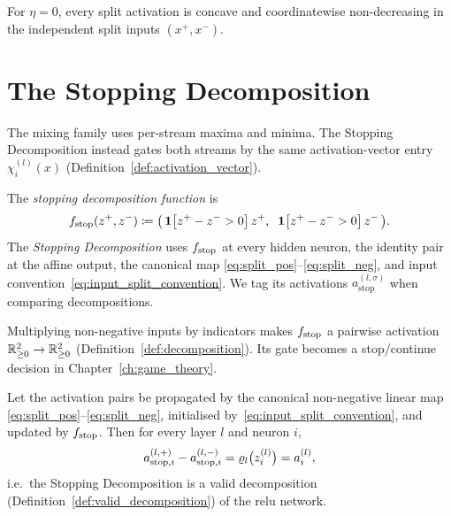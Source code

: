 \begin{remark}[The $\eta=0$ endpoint]\label{rem:eta_zero_extreme}
For $\eta=0$, every split activation is concave and coordinatewise non-decreasing in the independent split inputs $(x^+,x^-)$.
\end{remark}

\section{The Stopping Decomposition}\label{sec:stopping_decomposition}

The mixing family uses per-stream maxima and minima. The Stopping Decomposition instead gates both streams by the same activation-vector entry $\chi_i^{(l)}(x)$ (Definition~\ref{def:activation_vector}).

\begin{definition}\label{def:fstop}
The \emph{stopping decomposition function} is
\begin{equation}
	f_{\mathrm{stop}}(z^+, z^-) \coloneqq \bigl(\, \mathbf{1}\bigl[z^+ - z^- > 0\bigr]\, z^+, \;\; \mathbf{1}\bigl[z^+ - z^- > 0\bigr]\, z^- \,\bigr).
	\label{eq:fstop_def}
\end{equation}
The \emph{Stopping Decomposition} uses $f_{\mathrm{stop}}$ at every hidden neuron, the identity pair at the affine output, the canonical map \eqref{eq:split_pos}--\eqref{eq:split_neg}, and input convention~\eqref{eq:input_split_convention}. We tag its activations $a_{\mathrm{stop}}^{(l,\sigma)}$ when comparing decompositions.
\end{definition}

Multiplying non-negative inputs by indicators makes $f_{\mathrm{stop}}$ a pairwise activation $\mathbb{R}^2_{\ge 0}\to\mathbb{R}^2_{\ge 0}$ (Definition~\ref{def:decomposition}). Its gate becomes a stop/continue decision in Chapter~\ref{ch:game_theory}.

\begin{theoremenv}\label{thm:stopping_validity}
Let the activation pairs be propagated by the canonical non-negative linear map \eqref{eq:split_pos}--\eqref{eq:split_neg}, initialised by~\eqref{eq:input_split_convention}, and updated by $f_{\mathrm{stop}}$. Then for every layer $l$ and neuron $i$,
\begin{equation}
	a_{\mathrm{stop},i}^{(l,+)} - a_{\mathrm{stop},i}^{(l,-)} = \varrho_l\bigl(z^{(l)}_i\bigr) = a^{(l)}_i,
	\label{eq:stopping_recovery}
\end{equation}
i.e.\ the Stopping Decomposition is a valid decomposition (Definition~\ref{def:valid_decomposition}) of the \ac{relu} network.\end{theoremenv}


